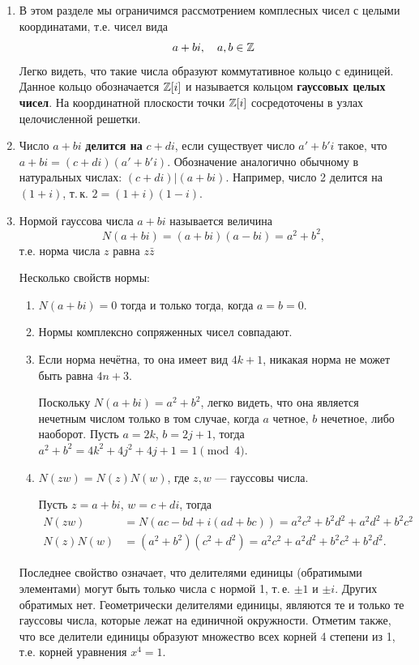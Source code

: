 \begin{enumerate}
\item В этом разделе мы ограничимся рассмотрением комплесных чисел с целыми координатами, т.е. чисел вида
$$
a+bi,\quad a,b\in\mathbb Z
$$
Легко видеть, что такие числа образуют коммутативное кольцо с единицей. Данное кольцо обозначается $\mathbb Z[i]$ и называется кольцом \textbf{гауссовых целых чисел}. На координатной плоскости точки $\mathbb Z[i]$ сосредоточены в узлах целочисленной решетки.
\item Число $a+bi$ \textbf{делится на} $c+di$, если существует число $a'+b'i$ такое, что $a+bi=(c+di)(a'+b'i)$. Обозначение аналогично обычному в натуральных числах: $(c+di)|(a+bi)$. Например, число 2 делится на $(1+i)$, т.\,к. $2=(1+i)(1-i)$.

\item 
Нормой гауссова числа $a+bi$ называется величина $$N(a+bi)=(a+bi)(a-bi)=a^2+b^2,$$
т.е. норма числа $z$ равна $z\bar z$

 Несколько свойств нормы:
\begin{enumerate}[{\bf Norm1}]
\item $N(a+bi)=0$ тогда и только тогда, когда $a=b=0$.
\item Нормы комплексно сопряженных чисел совпадают.
\item Если норма нечётна, то она имеет вид $4k+1$, никакая норма не может быть равна $4n+3$.

Поскольку $N(a+bi)=a^2+b^2$, легко видеть, что она является нечетным числом только в том случае, когда $a$ четное, $b$ нечетное, либо наоборот. Пусть $a=2k$, $b=2j+1$, тогда $a^2+b^2=4k^2+4j^2+4j+1 = 1\pmod 4$.

\item $N(zw)=N(z)N(w)$, где $z,w$ --- гауссовы числа.

Пусть $z=a+bi$, $w=c+di$, тогда
\begin{align*}
N(zw)    & = N(ac-bd+i(ad+bc)) = a^2c^2+b^2d^2+a^2d^2+b^2c^2 \\
N(z)N(w) & = (a^2+b^2)(c^2+d^2) = a^2c^2+a^2d^2+b^2c^2+b^2d^2.
\end{align*}
\end{enumerate}
Последнее свойство означает, что  делителями единицы (обратимыми элементами) могут быть только числа с нормой 1, т.\,е. $\pm 1$ и $\pm i$. Других обратимых нет. Геометрически делителями единицы, являются те и только те гауссовы числа, которые лежат на единичной окружности. Отметим также, что все делители единицы образуют множество всех корней 4 степени из 1, т.е. корней уравнения $x^4=1$.


\end{enumerate}
